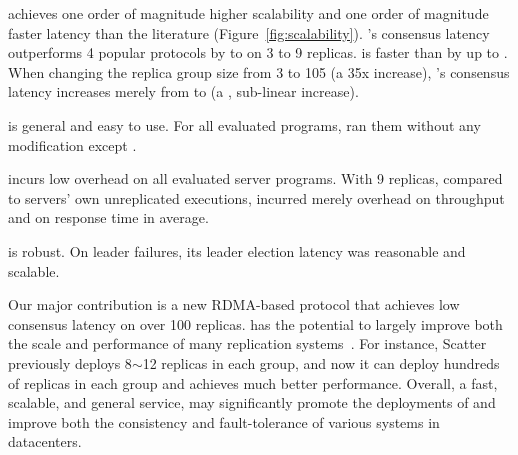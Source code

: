 \begin{tightenum}
\item \xxx achieves one order of magnitude higher scalability and one
order of magnitude faster latency than the literature 
(Figure~\ref{fig:scalability}). \xxx's consensus latency outperforms 4 
popular \paxos protocols by \comptradlow to \comptradhigh on 3 to 
9 replicas. \xxx is faster than \dare by up to \fasterDARE. When changing the 
replica group size from 3 to 105 (a 35x
increase), \xxx's consensus latency increases merely from \xxxlatencythree \us 
to \xxxlatencyonezerofive \us (a \xxxscalability, sub-linear increase).

\item \xxx is general and easy to use. For all \nprog evaluated programs, \xxx 
ran them without any modification except \calvin.


\item \xxx incurs low overhead on all \nprog evaluated server programs.
With 9 replicas, compared to servers' own unreplicated executions, \xxx
incurred merely \tputoverhead overhead on throughput and \latencyoverhead on
response time in average.

\item \xxx is robust. On leader failures, its leader election
latency was reasonable and scalable.







\end{tightenum}

Our major contribution is a new RDMA-based \paxos protocol that achieves 
low consensus latency on over 100 replicas. \xxx has the potential to largely 
improve both the scale and performance of many replication 
systems~\cite{scatter:sosp11,manos:hotdep10,crane:sosp15,rex:eurosys14, 
ssmr:dsn14,spaxos:srds12}. For instance, Scatter~\cite{scatter:sosp11} 
previously deploys 8$\sim$12 replicas in each \paxos group, and now it can 
deploy hundreds of replicas in each group and achieves much better performance. 
Overall, a fast, scalable, and general service, \xxx may significantly promote 
the deployments of \paxos and improve both the consistency and 
fault-tolerance of various systems in datacenters.

